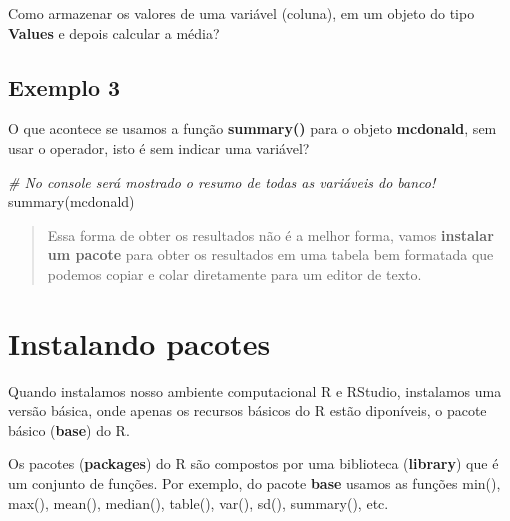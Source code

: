 \documentclass[
]{book}
\newenvironment{Shaded}{\begin{snugshade}}{\end{snugshade}}
\newcommand{\CommentTok}[1]{\textcolor[rgb]{0.56,0.35,0.01}{\textit{#1}}}
\newcommand{\FunctionTok}[1]{\textcolor[rgb]{0.00,0.00,0.00}{#1}}
\newcommand{\NormalTok}[1]{#1}
\newcommand{\OtherTok}[1]{\textcolor[rgb]{0.56,0.35,0.01}{#1}}
\newcommand{\SpecialCharTok}[1]{\textcolor[rgb]{0.00,0.00,0.00}{#1}}
\begin{document}
Como armazenar os valores de uma variável (coluna), em um objeto do tipo \textbf{Values} e depois calcular a média?

\begin{Shaded}
\end{Shaded}

\hypertarget{exemplo-3-1}{%
\section{Exemplo 3}\label{exemplo-3-1}}

O que acontece se usamos a função \textbf{summary()} para o objeto \textbf{mcdonald}, sem usar o operador, isto é sem indicar uma variável?

\begin{Shaded}
\begin{Highlighting}[]
\CommentTok{\# No console será mostrado o resumo de todas as variáveis do banco!}
\FunctionTok{summary}\NormalTok{(mcdonald)}
\end{Highlighting}
\end{Shaded}

\begin{quote}
Essa forma de obter os resultados não é a melhor forma, vamos \textbf{instalar um pacote} para obter os resultados em uma tabela bem formatada que podemos copiar e colar diretamente para um editor de texto.
\end{quote}

\hypertarget{instalando-pacotes}{%
\chapter{Instalando pacotes}\label{instalando-pacotes}}

Quando instalamos nosso ambiente computacional R e RStudio, instalamos uma versão básica, onde apenas os recursos básicos do R estão diponíveis, o pacote básico (\textbf{base}) do R.

Os pacotes (\textbf{packages}) do R são compostos por uma biblioteca (\textbf{library}) que é um conjunto de funções. Por exemplo, do pacote \textbf{base} usamos as funções min(), max(), mean(), median(), table(), var(), sd(), summary(), etc.
\end{document}
